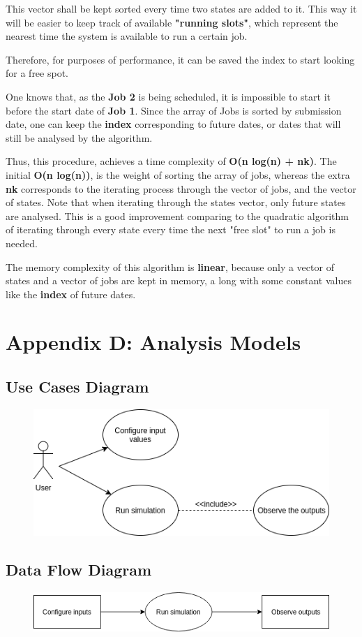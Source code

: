 \documentclass{scrreprt}
\begin{document}
\par This vector shall be kept sorted every time two states are added to it. This way it will be easier to keep track of available \textbf{"running slots"}, which represent the nearest time the system is available to run a certain job.
\par Therefore, for purposes of performance, it can be saved the index to start looking for a free spot.
\par One knows that, as the \textbf{Job 2} is being scheduled, it is impossible to start it before the start date of \textbf{Job 1}. Since the array of Jobs is sorted by submission date, one can keep the \textbf{index} corresponding to future dates, or dates that will still be analysed by the algorithm. 
\par Thus, this procedure, achieves a time complexity of \textbf{O(n log(n) + nk)}. The initial \textbf{O(n log(n))}, is the weight of sorting the array of jobs, whereas the extra \textbf{nk} corresponds to the iterating process through the vector of jobs, and the vector of states. Note that when iterating through the states vector, only future states are analysed. This is a good improvement comparing to the quadratic algorithm of iterating through every state every time the next "free slot" to run a job is needed.
\par The memory complexity of this algorithm is \textbf{linear}, because only a vector of states and a vector of jobs are kept in memory, a long with some constant values like the \textbf{index} of future dates.

\section{Appendix D: Analysis Models}

\subsection{Use Cases Diagram}

\begin{figure}[!htb]
  \centering
  \includegraphics[width=12cm]{usecases.png}
\end{figure}

\subsection{Data Flow Diagram}

\begin{figure}[!htb]
  \centering
  \includegraphics[width=12cm]{dataflow.png}
\end{figure}
\end{document}

